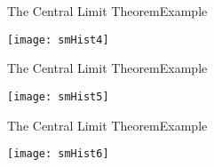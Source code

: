 \documentclass[xcolor=dvipsnames]{beamer}
\begin{document}
\begin{frame}{The Central Limit Theorem}{Example}
	\begin{center}
		\texttt{[image: smHist4]}
	\end{center}
\end{frame}

\begin{frame}{The Central Limit Theorem}{Example}
	\begin{center}
		\texttt{[image: smHist5]}
	\end{center}
\end{frame}

\begin{frame}{The Central Limit Theorem}{Example}
	\begin{center}
		\texttt{[image: smHist6]}
	\end{center}
\end{frame}
\end{document}
